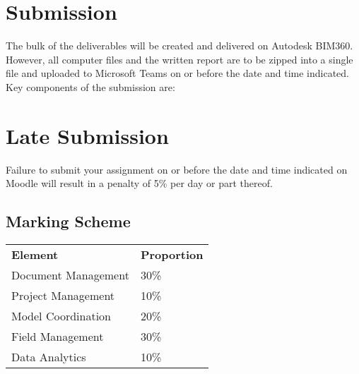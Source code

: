 \section*{Submission}
The bulk of the deliverables will be created and delivered on Autodesk BIM360.  However, all computer files and the written report are to be zipped into a single file and uploaded to Microsoft Teams on or before the date and time indicated.  Key components of the submission are:


\section*{Late Submission}
Failure to submit your assignment on or before the date and time indicated on Moodle will result in a penalty of 5\% per day or part thereof.

\subsection*{Marking Scheme}

\begin{table}[h!]
	\begin{center}
	\begin{tabular}{p{5cm}  p{5cm} }
     	\toprule
		\textbf{Element} & \textbf{Proportion} \\ 
    	\cmidrule(r){1-1}\cmidrule(lr){2-2}
      	Document Management & 30\%\\
      	Project Management & 10\%\\
      	Model Coordination & 20\%\\
      	Field Management & 30\%\\
      	Data Analytics & 10\%\\
      	\bottomrule
    \end{tabular}
    \label{tbl:markSchemeAsmt2}
    \end{center}
\end{table}

